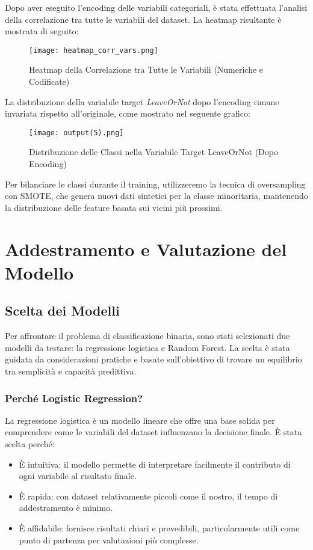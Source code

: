 \documentclass[a4paper,12pt]{article}
\begin{document}
Dopo aver eseguito l'encoding delle variabili categoriali, è stata effettuata l'analisi della correlazione tra tutte le variabili del dataset. La heatmap risultante è mostrata di seguito:
\begin{figure}[H]
    \centering
    \texttt{[image: heatmap\_corr\_vars.png]}
    \caption{Heatmap della Correlazione tra Tutte le Variabili (Numeriche e Codificate)}
    \label{fig:full_correlation_heatmap}
\end{figure}

La distribuzione della variabile target \textit{LeaveOrNot} dopo l'encoding rimane invariata rispetto all'originale, come mostrato nel seguente grafico:
\begin{figure}[H]
    \centering
    \texttt{[image: output(5).png]}
    \caption{Distribuzione delle Classi nella Variabile Target LeaveOrNot (Dopo Encoding)}
    \label{fig:class_balance_encoded}
\end{figure}

Per bilanciare le classi durante il training, utilizzeremo la tecnica di oversampling con SMOTE, che genera nuovi dati sintetici per la classe minoritaria, mantenendo la distribuzione delle feature basata sui vicini più prossimi.

\section{Addestramento e Valutazione del Modello}

\subsection{Scelta dei Modelli}
Per affrontare il problema di classificazione binaria, sono stati selezionati due modelli da testare: la regressione logistica e Random Forest. La scelta è stata guidata da considerazioni pratiche e basate sull'obiettivo di trovare un equilibrio tra semplicità e capacità predittiva.

\subsubsection{Perché Logistic Regression?}
La regressione logistica è un modello lineare che offre una base solida per comprendere come le variabili del dataset influenzano la decisione finale. È stata scelta perché:
\begin{itemize}
    \item È intuitiva: il modello permette di interpretare facilmente il contributo di ogni variabile al risultato finale.
    \item È rapida: con dataset relativamente piccoli come il nostro, il tempo di addestramento è minimo.
    \item È affidabile: fornisce risultati chiari e prevedibili, particolarmente utili come punto di partenza per valutazioni più complesse.
\end{itemize}
\end{document}
